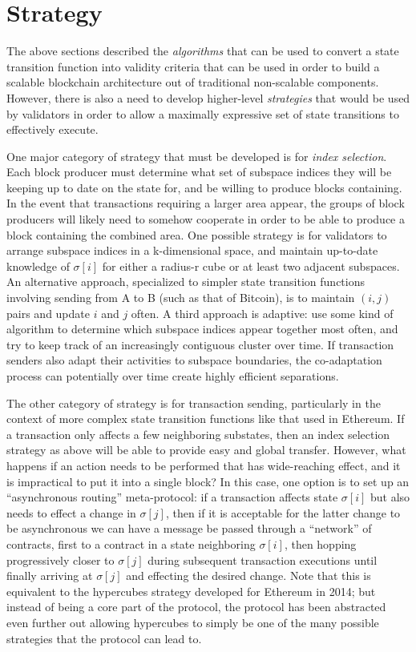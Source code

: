 \documentclass[11pt,a4paper]{report}
\theoremstyle{plain}
\theoremstyle{definition}
\theoremstyle{remark}
\begin{document}
\chapter{Strategy}

The above sections described the \emph{algorithms} that can be used to convert a state transition function into validity criteria that can be used in order to build a scalable blockchain architecture out of traditional non-scalable components. However, there is also a need to develop higher-level \emph{strategies} that would be used by validators in order to allow a maximally expressive set of state transitions to effectively execute.

One major category of strategy that must be developed is for \emph{index selection}. Each block producer must determine what set of subspace indices they will be keeping up to date on the state for, and be willing to produce blocks containing. In the event that transactions requiring a larger area appear, the groups of block producers will likely need to somehow cooperate in order to be able to produce a block containing the combined area. One possible strategy is for validators to arrange subspace indices in a k-dimensional space, and maintain up-to-date knowledge of $\sigma[i]$ for either a radius-r cube or at least two adjacent subspaces. An alternative approach, specialized to simpler state transition functions involving sending from A to B (such as that of Bitcoin), is to maintain $(i, j)$ pairs and update $i$ and $j$ often. A third approach is adaptive: use some kind of algorithm to determine which subspace indices appear together most often, and try to keep track of an increasingly contiguous cluster over time. If transaction senders also adapt their activities to subspace boundaries, the co-adaptation process can potentially over time create highly efficient separations.

The other category of strategy is for transaction sending, particularly in the context of more complex state transition functions like that used in Ethereum. If a transaction only affects a few neighboring substates, then an index selection strategy as above will be able to provide easy and global transfer. However, what happens if an action needs to be performed that has wide-reaching effect, and it is impractical to put it into a single block? In this case, one option is to set up an ``asynchronous routing'' meta-protocol: if a transaction affects state $\sigma[i]$ but also needs to effect a change in $\sigma[j]$, then if it is acceptable for the latter change to be asynchronous we can have a message be passed through a ``network'' of contracts, first to a contract in a state neighboring $\sigma[i]$, then hopping progressively closer to $\sigma[j]$ during subsequent transaction executions until finally arriving at $\sigma[j]$ and effecting the desired change. Note that this is equivalent to the hypercubes \cite{hypercubes} strategy developed for Ethereum in 2014; but instead of being a core part of the protocol, the protocol has been abstracted even further out allowing hypercubes to simply be one of the many possible strategies that the protocol can lead to.
\end{document}
